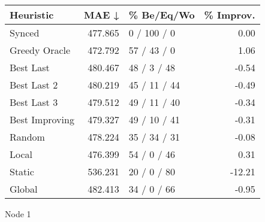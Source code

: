 \begin{tabular}{lrlr}
\toprule
\textbf{Heuristic} & \textbf{MAE ↓} & \textbf{\% Be/Eq/Wo} & \textbf{\% Improv.} \\
\midrule
            Synced &        477.865 &          0 / 100 / 0 &                0.00 \\
     Greedy Oracle &        472.792 &          57 / 43 / 0 &                1.06 \\
         Best Last &        480.467 &          48 / 3 / 48 &               -0.54 \\
       Best Last 2 &        480.219 &         45 / 11 / 44 &               -0.49 \\
       Best Last 3 &        479.512 &         49 / 11 / 40 &               -0.34 \\
    Best Improving &        479.327 &         49 / 10 / 41 &               -0.31 \\
            Random &        478.224 &         35 / 34 / 31 &               -0.08 \\
             Local &        476.399 &          54 / 0 / 46 &                0.31 \\
            Static &        536.231 &          20 / 0 / 80 &              -12.21 \\
            Global &        482.413 &          34 / 0 / 66 &               -0.95 \\
\bottomrule
\end{tabular}
\caption{Node 1}
\label{tab:iid_lr05_le2_bs4_1}
